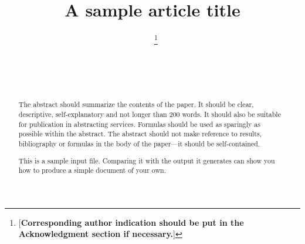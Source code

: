 \documentclass[aap]{imsart}
\theoremstyle{plain}
\theoremstyle{definition}
\begin{document}
\begin{frontmatter}
\title{A sample article title}

\begin{aug}
\author[A]{~ \thanks{[\textbf{Corresponding author indication should be put in the Acknowledgment section if necessary.}]}}
\author[B]{~}
\author[B]{~}
\address[A]{Department,
University or Company Name \textbf{[Additional affiliations should be put in the Acknowledgments section]}}

\address[B]{Department,
University or Company Name \textbf{[Additional affiliations should be put in the Acknowledgments section]}}
\end{aug}

\begin{abstract}
The abstract should summarize the contents of the paper.
It should be clear, descriptive, self-explanatory and not longer
than 200 words. It should also be suitable for publication in
abstracting services. Formulas should be used as sparingly as
possible within the abstract. The abstract should not make
reference to results, bibliography or formulas in the body
of the paper---it should be self-contained.

This is a sample input file.  Comparing it with the output it
generates can show you how to produce a simple document of
your own.
\end{abstract}

\begin{keyword}[class=MSC]
\end{keyword}

\begin{keyword}
\end{keyword}

\end{frontmatter}
\end{document}
